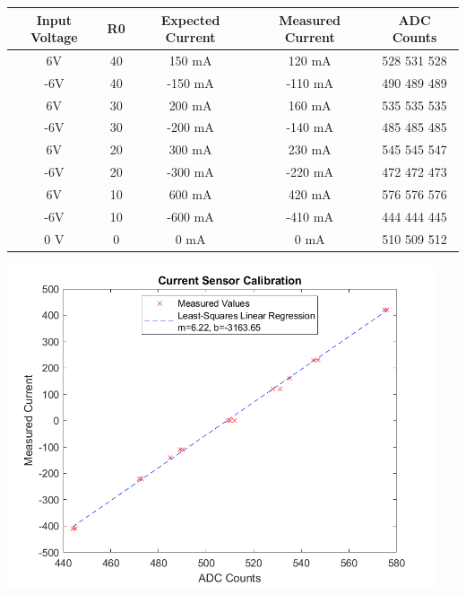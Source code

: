 \documentclass[12pt]{article}
\begin{document}
\begin{center}
\begin{tabular}{|c|c|c|c|c|}
    \hline
    Input Voltage & R0 & Expected Current & Measured Current & ADC Counts \\
    \hline
    6V & 40 & 150 mA & 120 mA & 528 531 528 \\
    \hline
    -6V & 40 & -150 mA & -110 mA & 490 489 489\\
    \hline
    6V & 30 & 200 mA & 160 mA & 535 535 535 \\
    \hline
    -6V & 30 & -200 mA & -140 mA & 485 485 485 \\
    \hline
    6V & 20 & 300 mA & 230 mA & 545 545 547 \\
    \hline
    -6V & 20 & -300 mA & -220 mA & 472 472 473 \\
    \hline
    6V & 10 & 600 mA & 420 mA & 576 576 576 \\
    \hline
    -6V & 10 & -600 mA & -410 mA & 444 444 445 \\
    \hline
    0 V & 0 & 0 mA & 0 mA & 510 509 512 \\
    \hline
\end{tabular}
\end{center}

\begin{center}
    \includegraphics[width=5in]{current_sensor_calibration_curve.png}
\end{center}
\end{document}
